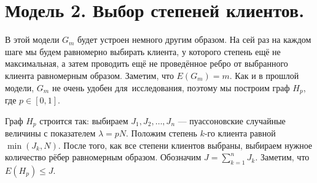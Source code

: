 \documentclass{matmex-diploma-custom}
\newcommand{\leqs}{\leqslant}
\theoremstyle{named}
\begin{document}
\newpage
\section*{Модель 2. Выбор степеней клиентов.}
В этой модели $G_m$ будет устроен немного другим образом. На сей раз на каждом шаге мы будем равномерно выбирать клиента, 
у которого степень ещё не максимальная, а затем проводить ещё не проведённое ребро от выбранного клиента равномерным образом.
Заметим, что $E(G_m) = m$. Как и в прошлой модели, $G_m$ не очень удобен для~исследования, поэтому мы построим граф $H_p$, где $p \in [0,1]$.

Граф $H_p$ строится так: выбираем $J_1, J_2, \dots, J_n$ --- пуассоновские случайные величины с показателем $\lambda = pN$.
Положим степень $k$-го клиента равной $\min(J_k, N)$. После того, как все степени клиентов выбраны, 
выбираем нужное количество рёбер равномерным образом. Обозначим $J = \sum\limits_{k=1}^n J_k$. Заметим, что $E(H_p) \leqs J$.
\end{document}
